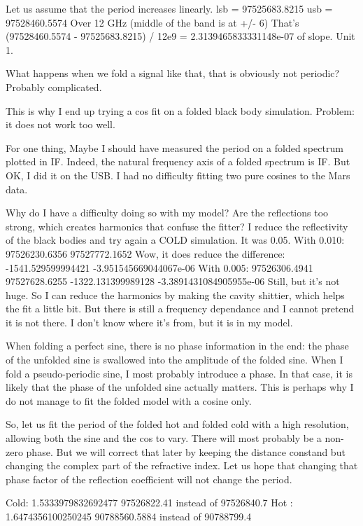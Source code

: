 Let us assume that the period increases linearly.
lsb = 97525683.8215
usb = 97528460.5574
Over 12 GHz (middle of the band is at +/- 6)
That's (97528460.5574 - 97525683.8215) / 12e9 = 2.3139465833331148e-07 of slope.  Unit 1.

What happens when we fold a signal like that, that is obviously not periodic?
Probably complicated.

This is why I end up trying a cos fit on a folded black body simulation.
Problem: it does not work too well.

For one thing, Maybe I should have measured the period on a folded spectrum plotted in IF.
Indeed, the natural frequency axis of a folded spectrum is IF.  But OK, I did it on the USB.
I had no difficulty fitting two pure cosines to the Mars data.

Why do I have a difficulty doing so with my model?  Are the reflections too strong, which
creates harmonics that confuse the fitter?  I reduce the reflectivity of the black bodies and try again a COLD simulation.  It was 0.05.
With 0.010:
  97526230.6356 97527772.1652
Wow, it does reduce the difference: -1541.529599994421 -3.951545669044067e-06
With 0.005:
  97526306.4941 97527628.6255
  -1322.131399989128 -3.3891431084905955e-06
  Still, but it's not huge.
So I can reduce the harmonics by making the cavity shittier, which helps the fit a little bit.
But there is still a frequency dependance and I cannot pretend it is not there.
I don't know where it's from, but it is in my model.

When folding a perfect sine, there is no phase information in the end: the phase of the unfolded sine is swallowed into the amplitude of the folded sine.
When I fold a pseudo-periodic sine, I most probably introduce a phase.
In that case, it is likely that the phase of the unfolded sine actually matters.
This is perhaps why I do not manage to fit the folded model with a cosine only.

So, let us fit the period of the folded hot and folded cold with a high resolution, allowing both the sine and the cos to vary.  There will most probably be a non-zero phase.
But we will correct that later by keeping the distance constand but changing the complex part of the refractive index.  Let us hope that changing that phase factor of the reflection coefficient will not change the period.

Cold: 1.5333979832692477 97526822.41    instead of 97526840.7
Hot : 1.6474356100250245 90788560.5884  instead of 90788799.4

